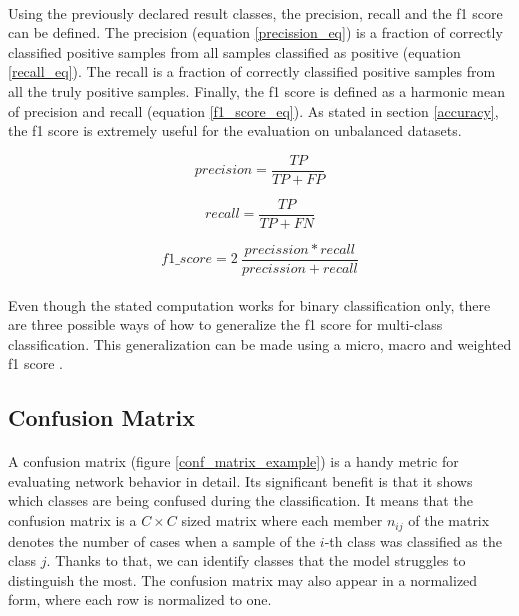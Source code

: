 \paragraph{}
Using the previously declared result classes, the precision, recall and the f1 score can be defined. The precision (equation \ref{precission_eq}) is a fraction of correctly classified positive samples from all samples classified as positive (equation \ref{recall_eq}). The recall is a fraction of correctly classified positive samples from all the truly positive samples. Finally, the f1 score is defined as  a harmonic mean of precision and recall (equation \ref{f1_score_eq}). As stated in section \ref{accuracy}, the f1 score is extremely useful for the evaluation on unbalanced datasets. 

\begin{equation}
precision = \frac{TP}{TP + FP}
\label{precission_eq}
\end{equation} 

\begin{equation}
recall = \frac{TP}{TP + FN}
\label{recall_eq}
\end{equation} 

\begin{equation}
f1\_score = 2\:\frac{precission*recall}{precission+recall}
\label{f1_score_eq}
\end{equation} 

\paragraph{}
Even though the stated computation works for binary classification only, there are three possible ways of how to generalize the f1 score for multi-class classification. This generalization can be made using a micro, macro and weighted f1 score \cite{multiclass_f1_score}.

\subsection{Confusion Matrix}
\paragraph{}
A confusion matrix (figure \ref{conf_matrix_example}) is a handy metric for evaluating network behavior in detail. Its significant benefit is that it shows which classes are being confused during the classification. It means that the confusion matrix is a $C \times C$ sized matrix where each member $n_{ij}$ of the matrix denotes the number of cases when a sample of the $i$-th class was classified as the class $j$. Thanks to that, we can identify classes that the model struggles to distinguish the most. The confusion matrix may also appear in a normalized form, where each row is normalized to one.

